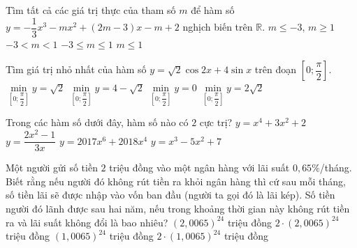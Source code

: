 \begin{ex}%
	Tìm tất cả các giá trị thực của tham số $m$ để hàm số $y=-\dfrac{1}{3}x^3-mx^2+(2m-3)x-m+2$ nghịch biến trên  $\mathbb{R}$.
	\choice
	{$m\le -3$, $m\ge 1$}
	{$-3<m<1$}
	{\True  $-3\le m\le 1$}
	{$m\le 1$}
	\end{ex}
\begin{ex}%
	Tìm giá trị nhỏ nhất của hàm số $y=\sqrt{2}\cos {2x}+4\sin x$  trên đoạn  $\left[ 0;\dfrac{\pi}{2}\right] $.
	\choice
	{\True  $\min  \limits_{\left[ 0;\dfrac{\pi}{2}\right] } y=\sqrt{2}$}
	{$\min \limits_{\left[ 0;\dfrac{\pi}{2}\right] }y=4-\sqrt{2}$}
	{$\min \limits_{\left[ 0;\dfrac{\pi}{2}\right] } y=0$}
	{$\min \limits_{\left[ 0;\dfrac{\pi}{2}\right] }y=2\sqrt{2}$}
	\end{ex}
\begin{ex}%
	Trong các hàm số dưới đây, hàm số nào có $2$ cực trị?
	\choice
	{$y=x^4+3x^2+2$}
	{$y=\dfrac{2x^2-1}{3x}$}
	{$y=2017x^6+2018x^4$}
	{\True  $y=x^3-5x^2+7$}
	\end{ex}
\begin{ex}%
	Một người gửi số tiền $2$ triệu đồng vào một ngân hàng với lãi suất  $0,65\%$/tháng. Biết rằng nếu người đó không rút tiền ra khỏi ngân hàng thì cứ sau mỗi tháng, số tiền lãi sẽ được nhập vào vốn ban đầu (người ta gọi đó là lãi kép). Số tiền người đó lãnh được sau hai năm, nếu trong khoảng thời gian này không rút tiền ra và lãi suất không đổi là bao nhiêu?
	\choice
	{$(2,0065)^{24}$ triệu đồng}
	{$2\cdot(2,0065)^{24}$  triệu đồng}
	{$(1,0065)^{24}$ triệu đồng}
	{\True  $2\cdot(1,0065)^{24}$ triệu đồng}
	\end{ex}

